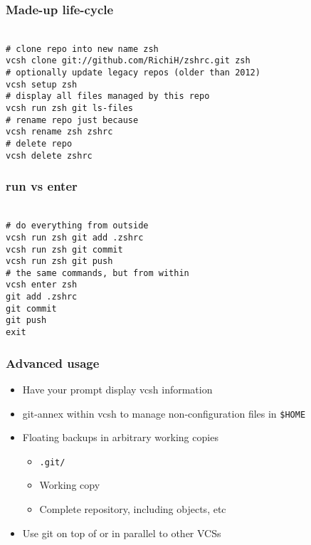 \documentclass[t]{beamer}
\begin{document}
\begin{frame}
	\frametitle{Made-up life-cycle}
	\texttt{ \\
		\# clone repo into new name zsh \\
		vcsh clone git://github.com/RichiH/zshrc.git zsh \\
		\# optionally update legacy repos (older than 2012)\\
		vcsh setup zsh \\
		\# display all files managed by this repo \\
		vcsh run zsh git ls-files \\
		\# rename repo just because \\
		vcsh rename zsh zshrc \\
		\# delete repo \\
		vcsh delete zshrc
	}
\end{frame}

\begin{frame}
	\frametitle{run vs enter}
	\texttt{ \\
		\# do everything from outside \\
		vcsh run zsh git add .zshrc \\
		vcsh run zsh git commit \\
		vcsh run zsh git push \\
		\# the same commands, but from within\\
		vcsh enter zsh \\
		git add .zshrc \\
		git commit \\
		git push \\
		exit
	}
\end{frame}

\begin{frame}
	\frametitle{Advanced usage}
	\begin{itemize}
		\item Have your prompt display vcsh information
		\item git-annex within vcsh to manage non-configuration files in \texttt{\$HOME}
		\item Floating backups in arbitrary working copies
		\begin{itemize}
			\item \texttt{.git/}
			\item Working copy
			\item Complete repository, including objects, etc
		\end{itemize}
		\item Use git on top of or in parallel to other VCSs
	\end{itemize}
\end{frame}
\end{document}
